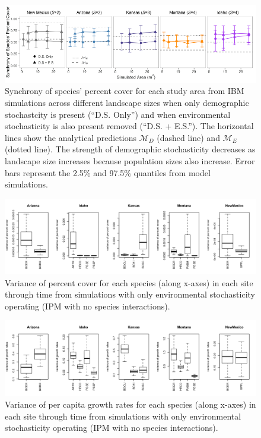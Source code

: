 \documentclass[12pt,]{article}
\begin{document}
\pagebreak{}

\begin{figure}[!ht]
  \centering
      \includegraphics[width=6in]{./components/formatted_figures/formatted_figureS3.png}
  \caption{Synchrony of species' percent cover for each study area from IBM simulations across different landscape sizes when only demographic stochastcity is present (``D.S. Only'') and when environmental stochasticity is also present removed (``D.S. + E.S.''). The horizontal lines show the analytical predictions $\mathcal{M}_D$ (dashed line) and $\mathcal{M}_E$ (dotted line). The strength of demographic stochasticity decreases as landscape size increases because population sizes also increase. Error bars represent the 2.5\% and 97.5\% quantiles from model simulations.}
\end{figure}

\pagebreak{}

\begin{figure}[!ht]
  \centering
      \includegraphics[width=6in]{./components/formatted_figures/environmental_variances_cover.png}
  \caption{Variance of percent cover for each species (along x-axes) in each site through time from simulations with only environmental stochasticity operating (IPM with no species interactions).}
\end{figure}

\begin{figure}[!ht]
  \centering
      \includegraphics[width=6in]{./components/formatted_figures/environmental_variances_pgr.png}
  \caption{Variance of per capita growth rates for each species (along x-axes) in each site through time from simulations with only environmental stochasticity operating (IPM with no species interactions).}
\end{figure}
\end{document}
